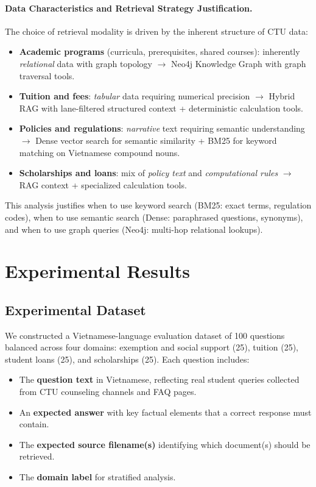 \documentclass[runningheads]{llncs}
\begin{document}
\paragraph{Data Characteristics and Retrieval Strategy Justification.}
The choice of retrieval modality is driven by the inherent structure of CTU data:

\begin{itemize}
    \item \textbf{Academic programs} (curricula, prerequisites, shared courses): inherently \emph{relational} data with graph topology $\to$ Neo4j Knowledge Graph with graph traversal tools.
    \item \textbf{Tuition and fees}: \emph{tabular} data requiring numerical precision $\to$ Hybrid RAG with lane-filtered structured context + deterministic calculation tools.
    \item \textbf{Policies and regulations}: \emph{narrative} text requiring semantic understanding $\to$ Dense vector search for semantic similarity + BM25 for keyword matching on Vietnamese compound nouns.
    \item \textbf{Scholarships and loans}: mix of \emph{policy text} and \emph{computational rules} $\to$ RAG context + specialized calculation tools.
\end{itemize}

This analysis justifies when to use keyword search (BM25: exact terms, regulation codes), when to use semantic search (Dense: paraphrased questions, synonyms), and when to use graph queries (Neo4j: multi-hop relational lookups).


\section{Experimental Results}
\label{sec:experiments}

\subsection{Experimental Dataset}
\label{sec:dataset}

We constructed a Vietnamese-language evaluation dataset of 100 questions balanced across four domains: exemption and social support (25), tuition (25), student loans (25), and scholarships (25). Each question includes:
\begin{itemize}
    \item The \textbf{question text} in Vietnamese, reflecting real student queries collected from CTU counseling channels and FAQ pages.
    \item An \textbf{expected answer} with key factual elements that a correct response must contain.
    \item The \textbf{expected source filename(s)} identifying which document(s) should be retrieved.
    \item The \textbf{domain label} for stratified analysis.
\end{itemize}
\end{document}
